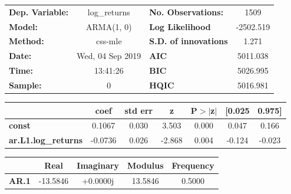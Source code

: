 \begin{center}
\begin{tabular}{lclc}
\toprule
\textbf{Dep. Variable:}     &        log\_returns       & \textbf{  No. Observations:  } &            1509            \\
\textbf{Model:}             &         ARMA(1, 0)        & \textbf{  Log Likelihood     } &         -2502.519          \\
\textbf{Method:}            &          css-mle          & \textbf{  S.D. of innovations} &           1.271            \\
\textbf{Date:}              &      Wed, 04 Sep 2019     & \textbf{  AIC                } &          5011.038          \\
\textbf{Time:}              &          13:41:26         & \textbf{  BIC                } &          5026.995          \\
\textbf{Sample:}            &             0             & \textbf{  HQIC               } &          5016.981          \\
\bottomrule
\end{tabular}
\begin{tabular}{lcccccc}
                            & \textbf{coef} & \textbf{std err} & \textbf{z} & \textbf{P$> |$z$|$} & \textbf{[0.025} & \textbf{0.975]}  \\
\midrule
\textbf{const}              &       0.1067  &        0.030     &     3.503  &         0.000        &        0.047    &        0.166     \\
\textbf{ar.L1.log\_returns} &      -0.0736  &        0.026     &    -2.868  &         0.004        &       -0.124    &       -0.023     \\
\bottomrule
\end{tabular}
\begin{tabular}{lcccc}
              & \textbf{            Real} & \textbf{         Imaginary} & \textbf{         Modulus} & \textbf{        Frequency}  \\
\midrule
\textbf{AR.1} &              -13.5846     &                +0.0000j     &               13.5846     &                0.5000       \\
\bottomrule
\end{tabular}
\end{center}
